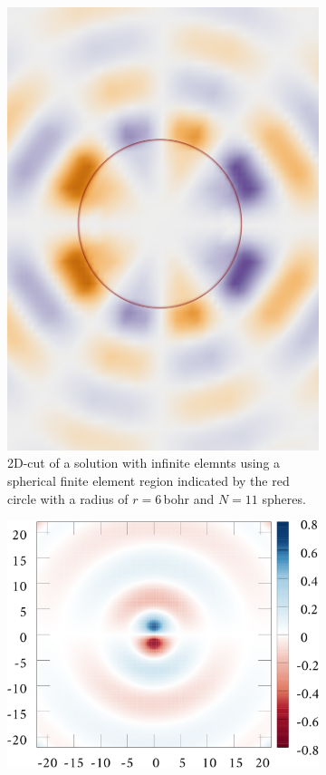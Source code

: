\begin{figure}%
\begin{subfigure}{0.5\textwidth}
   \includegraphics[width=\textwidth]{Figures/BC/plane_fin}
   \caption{2D-cut of a solution with infinite elemnts using a spherical finite element region indicated by the red circle with a radius of $r=6\,$bohr and $N=11$ spheres.}
\end{subfigure}
\begin{subfigure}{0.5\textwidth}
   \includegraphics[width=\textwidth]{Figures/RBF/P-Wave}

\end{subfigure}
\end{figure}

